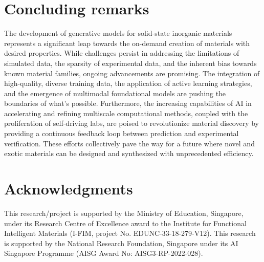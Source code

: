 \documentclass{iopjournal}
\begin{document}
\section*{Concluding remarks}
The development of generative models for solid-state inorganic materials represents a significant leap towards the on-demand creation of materials with desired properties. While challenges persist in addressing the limitations of simulated data, the sparsity of experimental data, and the inherent bias towards known material families, ongoing advancements are promising. The integration of high-quality, diverse training data, the application of active learning strategies, and the emergence of multimodal foundational models are pushing the boundaries of what's possible. Furthermore, the increasing capabilities of AI in accelerating and refining multiscale computational methods, coupled with the proliferation of self-driving labs, are poised to revolutionize material discovery by providing a continuous feedback loop between prediction and experimental verification. These efforts collectively pave the way for a future where novel and exotic materials can be designed and synthesized with unprecedented efficiency.
\section*{Acknowledgments}
This research/project is supported by the Ministry of Education, Singapore, under its Research Centre of Excellence award to the Institute for Functional Intelligent Materials (I-FIM, project No. EDUNC-33-18-279-V12). This research is supported by the National Research Foundation, Singapore under its AI Singapore Programme (AISG Award No: AISG3-RP-2022-028).
\end{document}
